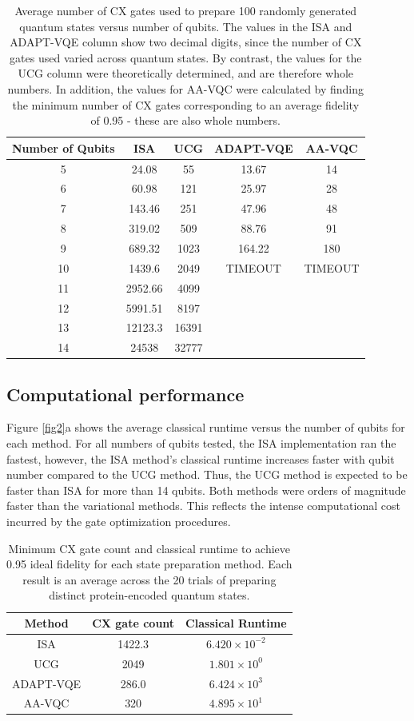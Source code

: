 \begin{table}[h]
\centering
\caption{Average number of CX gates used to prepare 100 randomly generated quantum states versus number of qubits. The values in the ISA and ADAPT-VQE column show two decimal digits, since the number of CX gates used varied across quantum states. By contrast, the values for the UCG column were theoretically determined, and are therefore whole numbers. In addition, the values for AA-VQC were calculated by finding the minimum number of CX gates corresponding to an average fidelity of 0.95 - these are also whole numbers.}
\begin{tabular}{|c||c|c|c|c|}
\hline
Number of Qubits & ISA & UCG & ADAPT-VQE & AA-VQC\\
\hline
5 & 24.08 & 55 & 13.67 & 14 \\
6 & 60.98 & 121 & 25.97 & 28 \\
7 & 143.46 & 251 & 47.96 & 48 \\
8 & 319.02 & 509 & 88.76 & 91 \\
9 & 689.32 & 1023 & 164.22 & 180 \\
10 & 1439.6 & 2049 & TIMEOUT & TIMEOUT \\
11 & 2952.66 & 4099 & & \\
12 & 5991.51 & 8197 & & \\
13 & 12123.3 & 16391 & & \\
14 & 24538 & 32777 & & \\
\hline
\end{tabular}
\end{table}




\subsection{Computational performance}
Figure \ref{fig2}a shows the average classical runtime versus the number of qubits for each
method. For all numbers of qubits tested, the ISA implementation ran the fastest,
however, the ISA method's classical runtime increases faster with qubit number
compared to the UCG method. Thus, the UCG method is expected to be faster than ISA
for more than 14 qubits. Both methods were orders of magnitude faster than the
variational methods. This reflects the intense computational cost incurred by
the gate optimization procedures.

\begin{table}[h]
\centering
\caption{Minimum CX gate count and classical runtime to achieve 0.95 ideal
fidelity for each state preparation method. Each result is an average across 
the 20 trials of preparing distinct protein-encoded quantum states.}
\begin{tabular}{|c|c|c|}
\hline
Method & CX gate count & Classical Runtime \\
\hline
ISA & 1422.3 & $6.420 \times 10^{-2}$ \\
UCG & 2049 & $1.801 \times 10^0$ \\
ADAPT-VQE & 286.0 & $6.424 \times 10^3$ \\
AA-VQC & 320 & $4.895 \times 10^1$ \\
\hline
\end{tabular}
\end{table}

